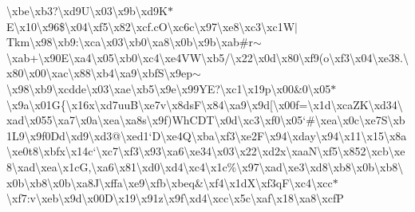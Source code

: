 \begin{DoxyCompactItemize}
\textbackslash{}xbe\textbackslash{}xb3?\textbackslash{}xd9\+U\textbackslash{}x03\textbackslash{}x9b\textbackslash{}xd9\+K$\ast$\+E\textbackslash{}x10\textbackslash{}x96\$\textbackslash{}x04\textbackslash{}xf5\textbackslash{}x82\textbackslash{}xcf.\+c\+O\textbackslash{}xc6c\textbackslash{}x97\textbackslash{}xe8\textbackslash{}xc3\textbackslash{}xc1\+W$\vert$\+Tkm\textbackslash{}x98\textbackslash{}xb9\+:\textbackslash{}xca\textbackslash{}x03\textbackslash{}xb0\textbackslash{}xa8\textbackslash{}x0b\textbackslash{}x9b\textbackslash{}xab\#r$\sim$\textbackslash{}xab+\textbackslash{}x90\+E\textbackslash{}xa4\textbackslash{}x05\textbackslash{}xb0\textbackslash{}xc4\textbackslash{}xe4\+V\+W\textbackslash{}xb5/\textbackslash{}x22\textbackslash{}x0d\textbackslash{}x80\textbackslash{}xf9(o\textbackslash{}xf3\textbackslash{}x04\textbackslash{}xe38.\textbackslash{}x80\textbackslash{}x00\textbackslash{}xac\textbackslash{}x88\textbackslash{}xb4\textbackslash{}xa9\textbackslash{}xbf\+S\textbackslash{}x9ep$\sim$\textbackslash{}x98\textbackslash{}xb9\textbackslash{}xcdde\textbackslash{}x03\textbackslash{}xae\textbackslash{}xb5\textbackslash{}x9e\textbackslash{}x99\+Y\+E?\textbackslash{}xc1\textbackslash{}x19p\textbackslash{}x00\&0\textbackslash{}x05$\ast$\textbackslash{}x9a\textbackslash{}x01\+G\{\textbackslash{}x16x\textbackslash{}xd7uu\+B\textbackslash{}xe7v\textbackslash{}x8ds\+F\textbackslash{}x84\textbackslash{}xa9\textbackslash{}x9d\mbox{[}\textbackslash{}x00f=\textbackslash{}x1d\textbackslash{}xca\+Z\+K\textbackslash{}xd34\textbackslash{}xad\textbackslash{}x055\textbackslash{}xa7\textbackslash{}x0a\textbackslash{}xea\textbackslash{}xa8s\textbackslash{}x9f)\+Wh\+C\+D\+T\textbackslash{}x0d\textbackslash{}xc3\textbackslash{}xf0\textbackslash{}x05`\#\textbackslash{}xea\textbackslash{}x0c\textbackslash{}xe7\+S\textbackslash{}xb1\+L9\textbackslash{}x9f0\+Dd\textbackslash{}xd9\textbackslash{}xd3@\textbackslash{}xed1`\+D\textbackslash{}xe4\+Q\textbackslash{}xba\textbackslash{}xf3\textbackslash{}xe2\+F\textbackslash{}x94\textbackslash{}xday\textbackslash{}x94\textbackslash{}x11\textbackslash{}x15\textbackslash{}x8a\textbackslash{}xe0t8\textbackslash{}xbfx\textbackslash{}x14c`\textbackslash{}xc7\textbackslash{}xf3\textbackslash{}x93\textbackslash{}xa6\textbackslash{}xe34\textbackslash{}x03\textbackslash{}x22\textbackslash{}xd2x\textbackslash{}xaa\+N\textbackslash{}xf5\textbackslash{}x852\textbackslash{}xcb\textbackslash{}xe8\textbackslash{}xad\textbackslash{}xea\textbackslash{}x1c\+G,\textbackslash{}xa6\textbackslash{}x81\textbackslash{}xd0\textbackslash{}xd4\textbackslash{}xc4\textbackslash{}x1c\%\textbackslash{}x97\textbackslash{}xad\textbackslash{}xe3\textbackslash{}xd8\textbackslash{}xb8\textbackslash{}x0b\textbackslash{}xb8\textbackslash{}x0b\textbackslash{}xb8\textbackslash{}x0b\textbackslash{}xa8\+J\textbackslash{}xffa\textbackslash{}xe9\textbackslash{}xfb\textbackslash{}xbeq\&\textbackslash{}xf4\textbackslash{}x1d\+X\textbackslash{}xf3q\+F\textbackslash{}xc4\textbackslash{}xcc$\ast$\textbackslash{}xf7\+:v\textbackslash{}xeb\textbackslash{}x9d\textbackslash{}x00\+D\textbackslash{}x19\textbackslash{}x91z\textbackslash{}x9f\textbackslash{}xd4\textbackslash{}xcc\textbackslash{}x5c\textbackslash{}xaf\textbackslash{}x18\textbackslash{}xa8\textbackslash{}xcf\+P\textb
\end{DoxyCompactItemize}
